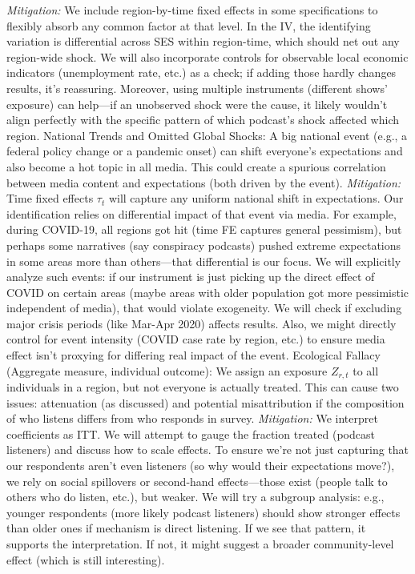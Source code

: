 \documentclass[12pt]{article}
\begin{document}
\textit{Mitigation:} We include region-by-time fixed effects in some specifications to flexibly absorb any common factor at that level. In the IV, the identifying variation is differential across SES within region-time, which should net out any region-wide shock. We will also incorporate controls for observable local economic indicators (unemployment rate, etc.) as a check; if adding those hardly changes results, it's reassuring. Moreover, using multiple instruments (different shows' exposure) can help—if an unobserved shock were the cause, it likely wouldn't align perfectly with the specific pattern of which podcast's shock affected which region.
National Trends and Omitted Global Shocks: A big national event (e.g., a federal policy change or a pandemic onset) can shift everyone's expectations and also become a hot topic in all media. This could create a spurious correlation between media content and expectations (both driven by the event). \textit{Mitigation:} Time fixed effects $\tau_t$ will capture any uniform national shift in expectations. Our identification relies on differential impact of that event via media. For example, during COVID-19, all regions got hit (time FE captures general pessimism), but perhaps some narratives (say conspiracy podcasts) pushed extreme expectations in some areas more than others—that differential is our focus. We will explicitly analyze such events: if our instrument is just picking up the direct effect of COVID on certain areas (maybe areas with older population got more pessimistic independent of media), that would violate exogeneity. We will check if excluding major crisis periods (like Mar-Apr 2020) affects results. Also, we might directly control for event intensity (COVID case rate by region, etc.) to ensure media effect isn't proxying for differing real impact of the event.
Ecological Fallacy (Aggregate measure, individual outcome): We assign an exposure $Z_{r,t}$ to all individuals in a region, but not everyone is actually treated. This can cause two issues: attenuation (as discussed) and potential misattribution if the composition of who listens differs from who responds in survey. \textit{Mitigation:} We interpret coefficients as ITT. We will attempt to gauge the fraction treated (podcast listeners) and discuss how to scale effects. To ensure we're not just capturing that our respondents aren't even listeners (so why would their expectations move?), we rely on social spillovers or second-hand effects—those exist (people talk to others who do listen, etc.), but weaker. We will try a subgroup analysis: e.g., younger respondents (more likely podcast listeners) should show stronger effects than older ones if mechanism is direct listening. If we see that pattern, it supports the interpretation. If not, it might suggest a broader community-level effect (which is still interesting).
\end{document}
